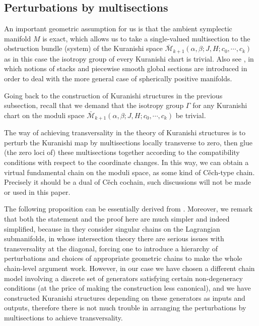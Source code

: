 \documentclass{amsart}
\numberwithin{equation}{section}
\numberwithin{figure}{section}
\begin{document}
\subsection{Perturbations by multisections}
	An important geometric assumption for us is that the ambient symplectic manifold $M$ is exact, which allows us to take a single-valued multisection to the obstruction bundle (system) of the Kuranishi space $\bar{\mathcal{M}}_{k+1}(\alpha, \beta; J, H; c_{0}, \cdots, c_{k})$ as in this case the isotropy group of every Kuranishi chart is trivial. Also see \cite{FOOO4}, in which notions of stacks and piecewise smooth global sections are introduced in order to deal with the more general case of spherically positive manifolds. \par
	Going back to the construction of Kuranishi structures in the previous subsection, recall that we demand that the isotropy group $\Gamma$ for any Kuranishi chart on the moduli space $\bar{\mathcal{M}}_{k+1}(\alpha, \beta; J, H; c_{0}, \cdots, c_{k})$ be trivial. \par
	The way of achieving transversality in the theory of Kuranishi structures is to perturb the Kuranishi map by multisections locally transverse to zero, then glue (the zero loci of) these multisections together according to the compatibility conditions with respect to the coordinate changes. In this way, we can obtain a virtual fundamental chain on the moduli space, as some kind of C\v{e}ch-type chain. Precisely it should be a dual of C\v{e}ch cochain, such discussions will not be made or used in this paper. \par
	The following proposition can be essentially derived from \cite{FOOO2}. Moreover, we remark that both the statement and the proof here are much simpler and indeed simplified, because in \cite{FOOO2} they consider singular chains on the Lagrangian submanifolds, in whose intersection theory there are serious issues with transversality at the diagonal, forcing one to introduce a hierarchy of perturbations and choices of appropriate geometric chains to make the whole chain-level argument work. However, in our case we have chosen a different chain model involving a discrete set of generators satisfying certain non-degeneracy conditions (at the price of making the construction less canonical), and we have constructed Kuranishi structures depending on these generators as inputs and outputs, therefore there is not much trouble in arranging the perturbations by multisections to achieve transversality. \par
\end{document}

